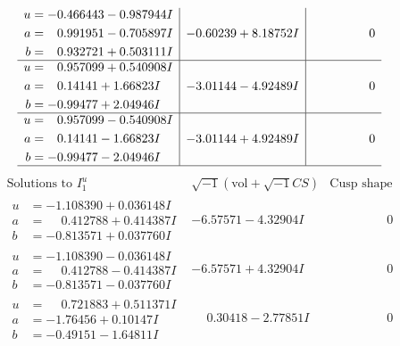 \documentclass[1p]{elsarticle_modified}
\theoremstyle{definition}
\newcommand{\I}{\sqrt{-1}}
\begin{document}
$$\begin{array}{c|c|c}
\begin{aligned}
u &= -0.466443 - 0.987944 I \\
a &= \phantom{-}0.991951 - 0.705897 I \\
b &= \phantom{-}0.932721 + 0.503111 I\end{aligned}
 & -0.60239 + 8.18752 I & \phantom{-0.000000 } 0 \\ \hline\begin{aligned}
u &= \phantom{-}0.957099 + 0.540908 I \\
a &= \phantom{-}0.14141 + 1.66823 I \\
b &= -0.99477 + 2.04946 I\end{aligned}
 & -3.01144 - 4.92489 I & \phantom{-0.000000 } 0 \\ \hline\begin{aligned}
u &= \phantom{-}0.957099 - 0.540908 I \\
a &= \phantom{-}0.14141 - 1.66823 I \\
b &= -0.99477 - 2.04946 I\end{aligned}
 & -3.01144 + 4.92489 I & \phantom{-0.000000 } 0\\
 \hline 
 \end{array}$$\newpage$$\begin{array}{c|c|c}  
\text{Solutions to }I^u_{1}& \I (\text{vol} + \sqrt{-1}CS) & \text{Cusp shape}\\
 \hline 
\begin{aligned}
u &= -1.108390 + 0.036148 I \\
a &= \phantom{-}0.412788 + 0.414387 I \\
b &= -0.813571 + 0.037760 I\end{aligned}
 & -6.57571 - 4.32904 I & \phantom{-0.000000 } 0 \\ \hline\begin{aligned}
u &= -1.108390 - 0.036148 I \\
a &= \phantom{-}0.412788 - 0.414387 I \\
b &= -0.813571 - 0.037760 I\end{aligned}
 & -6.57571 + 4.32904 I & \phantom{-0.000000 } 0 \\ \hline\begin{aligned}
u &= \phantom{-}0.721883 + 0.511371 I \\
a &= -1.76456 + 0.10147 I \\
b &= -0.49151 - 1.64811 I\end{aligned}
 & \phantom{-}0.30418 - 2.77851 I & \phantom{-0.000000 } 0 \\ \hline\begin{aligned}

\end{aligned}
\end{array}$$
\end{document}
